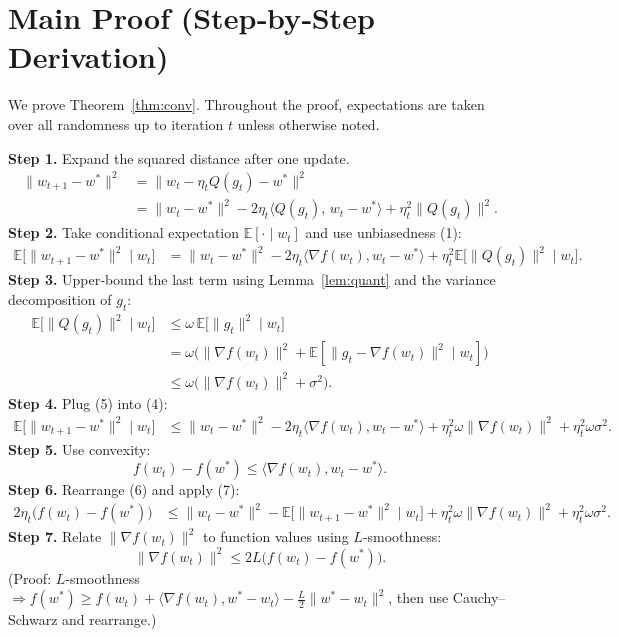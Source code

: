 \documentclass[11pt]{article}
\newcommand{\E}{\mathbb{E}}
\begin{document}
\section*{Main Proof (Step‑by‑Step Derivation)}
We prove Theorem~\ref{thm:conv}. Throughout the proof, expectations are taken over all randomness up to iteration $t$ unless otherwise noted.

\bigskip
\noindent\textbf{Step 1.} Expand the squared distance after one update.
\begin{align}
\|w_{t+1}-w^{*}\|^{2}
&= \|w_{t}-\eta_{t}Q(g_{t})-w^{*}\|^{2} \nonumber\\
&= \|w_{t}-w^{*}\|^{2}
      -2\eta_{t}\langle Q(g_{t}),\,w_{t}-w^{*}\rangle
      +\eta_{t}^{2}\|Q(g_{t})\|^{2}. \tag{3}
\end{align}
\noindent\textbf{Step 2.} Take conditional expectation $\E[\cdot\mid w_{t}]$ and use unbiasedness (1):
\begin{align}
\E\big[\|w_{t+1}-w^{*}\|^{2}\mid w_{t}\big]
&= \|w_{t}-w^{*}\|^{2}
   -2\eta_{t}\langle \nabla f(w_{t}),w_{t}-w^{*}\rangle
   +\eta_{t}^{2}\E\big[\|Q(g_{t})\|^{2}\mid w_{t}\big]. \tag{4}
\end{align}
\noindent\textbf{Step 3.} Upper‑bound the last term using Lemma~\ref{lem:quant} and the variance decomposition of $g_{t}$:
\begin{align}
\E\big[\|Q(g_{t})\|^{2}\mid w_{t}\big]
&\le \omega\,\E\big[\|g_{t}\|^{2}\mid w_{t}\big] \nonumber\\
&= \omega\big(\|\nabla f(w_{t})\|^{2}
          +\E[\|g_{t}-\nabla f(w_{t})\|^{2}\mid w_{t}]\big) \nonumber\\
&\le \omega\big(\|\nabla f(w_{t})\|^{2}+\sigma^{2}\big). \tag{5}
\end{align}
\noindent\textbf{Step 4.} Plug (5) into (4):
\begin{align}
\E\big[\|w_{t+1}-w^{*}\|^{2}\mid w_{t}\big]
&\le \|w_{t}-w^{*}\|^{2}
   -2\eta_{t}\langle \nabla f(w_{t}),w_{t}-w^{*}\rangle
   +\eta_{t}^{2}\omega\|\nabla f(w_{t})\|^{2}
   +\eta_{t}^{2}\omega\sigma^{2}. \tag{6}
\end{align}
\noindent\textbf{Step 5.} Use convexity:
\[
f(w_{t})-f(w^{*})\le \langle \nabla f(w_{t}),w_{t}-w^{*}\rangle . \tag{7}
\]
\noindent\textbf{Step 6.} Rearrange (6) and apply (7):
\begin{align}
2\eta_{t}\big(f(w_{t})-f(w^{*})\big)
&\le \|w_{t}-w^{*}\|^{2}
   -\E\big[\|w_{t+1}-w^{*}\|^{2}\mid w_{t}\big]
   +\eta_{t}^{2}\omega\|\nabla f(w_{t})\|^{2}
   +\eta_{t}^{2}\omega\sigma^{2}. \tag{8}
\end{align}
\noindent\textbf{Step 7.} Relate $\|\nabla f(w_{t})\|^{2}$ to function values using $L$‑smoothness:
\[
\|\nabla f(w_{t})\|^{2}\le 2L\big(f(w_{t})-f(w^{*})\big). \tag{9}
\]
(Proof: $L$‑smoothness $\Rightarrow f(w^{*})\ge f(w_{t})+\langle\nabla f(w_{t}),w^{*}-w_{t}\rangle-\frac{L}{2}\|w^{*}-w_{t}\|^{2}$, then use Cauchy–Schwarz and rearrange.)
\end{document}
